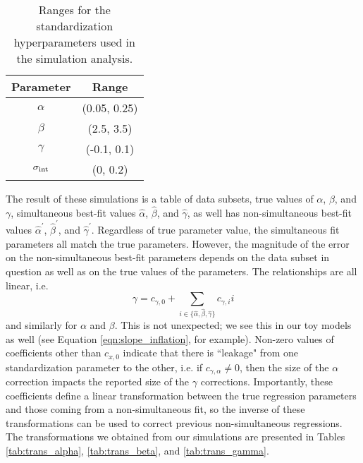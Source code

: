 \begin{table}
    \centering
    \begin{tabular}{cc}
    \toprule
        Parameter & Range \\\midrule
        $\alpha$ & (0.05, 0.25) \\
        $\beta$ & (2.5, 3.5) \\
        $\gamma$ & (-0.1, 0.1) \\
        $\sigma_{\text{int}}$ & (0, 0.2) \\\bottomrule
    \end{tabular}
    \caption{Ranges for the standardization hyperparameters used in the simulation analysis.}
    \label{tab:sim_ranges}
\end{table}

The result of these simulations is a table of data subsets, true values of $\alpha$, $\beta$, and $\gamma$, simultaneous best-fit values $\hat{\alpha}$, $\hat{\beta}$, and $\hat{\gamma}$, as well has non-simultaneous best-fit values $\hat{\alpha}^\prime$, $\hat{\beta}^\prime$, and $\hat{\gamma}^\prime$. Regardless of true parameter value, the simultaneous fit parameters all match the true parameters. However, the magnitude of the error on the non-simultaneous best-fit parameters depends on the data subset in question as well as on the true values of the parameters. The relationships are all linear, i.e.
\begin{equation}
    \gamma = c_{\gamma, 0} + \displaystyle\sum_{i\in\{\hat{\alpha}, \hat{\beta}, \hat{\gamma}\}} c_{\gamma, i}i
    \label{eqn:lin_decomp_reg_bias}
\end{equation}
and similarly for $\alpha$ and $\beta$. This is not unexpected; we see this in our toy models as well (see Equation \ref{eqn:slope_inflation}, for example). Non-zero values of coefficients other than $c_{x, 0}$ indicate that there is ``leakage" from one standardization parameter to the other, i.e. if $c_{\gamma, \alpha} \neq 0$, then the size of the $\alpha$ correction impacts the reported size of the $\gamma$ corrections. Importantly, these coefficients define a linear transformation between the true regression parameters and those coming from a non-simultaneous fit, so the inverse of these transformations can be used to correct previous non-simultaneous regressions. The transformations we obtained from our simulations are presented in Tables \ref{tab:trans_alpha}, \ref{tab:trans_beta}, and \ref{tab:trans_gamma}.

